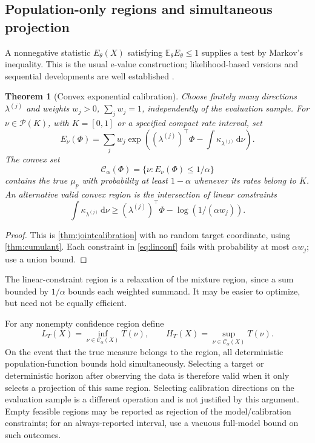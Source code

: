 \documentclass[11pt]{article}
\numberwithin{equation}{section}
\newtheorem{theorem}{Theorem}[section]
\theoremstyle{definition}
\theoremstyle{remark}
\newcommand{\E}{\mathbb E}
\newcommand{\Prob}{\mathcal P}
\newcommand{\Ccal}{\mathcal C}
\newcommand{\dd}{\,\mathrm d}
\begin{document}
\subsection{Population-only regions and simultaneous projection}
A nonnegative statistic $E_\theta(X)$ satisfying $\E_\theta E_\theta\le1$ supplies a test by Markov's inequality. This is the usual e-value construction; likelihood-based versions and sequential developments are well established \cite{Wasserman2020,Howard2021}.

\begin{theorem}[Convex exponential calibration]\label{thm:calibration}
Choose finitely many directions $\lambda^{(j)}$ and weights $w_j>0$, $\sum_jw_j=1$, independently of the evaluation sample. For $\nu\in\Prob(K)$, with $K=[0,1]$ or a specified compact rate interval, set
\[
 E_\nu(\Phi)=\sum_jw_j\exp\left((\lambda^{(j)})^\top\Phi
                               -\int\kappa_{\lambda^{(j)}}\dd\nu\right).
\]
The convex set
\begin{equation}\label{eq:confset}
 \Ccal_\alpha(\Phi)=\{\nu:E_\nu(\Phi)\le1/\alpha\}
\end{equation}
contains the true $\mu_p$ with probability at least $1-\alpha$ whenever its rates belong to $K$.
An alternative valid convex region is the intersection of linear constraints
\begin{equation}\label{eq:linconf}
 \int\kappa_{\lambda^{(j)}}\dd\nu\ge
 (\lambda^{(j)})^\top\Phi-\log(1/(\alpha w_j)).
\end{equation}
\end{theorem}
\begin{proof}
This is \cref{thm:jointcalibration} with no random target coordinate, using \cref{thm:cumulant}. Each constraint in \eqref{eq:linconf} fails with probability at most $\alpha w_j$; use a union bound.
\end{proof}
The linear-constraint region is a relaxation of the mixture region, since a sum bounded by $1/\alpha$ bounds each weighted summand. It may be easier to optimize, but need not be equally efficient.

For any nonempty confidence region define
\begin{equation}\label{eq:projection}
 L_T(X)=\inf_{\nu\in\Ccal_\alpha(X)}T(\nu),\qquad
 H_T(X)=\sup_{\nu\in\Ccal_\alpha(X)}T(\nu).
\end{equation}
On the event that the true measure belongs to the region, all deterministic population-function bounds hold simultaneously. Selecting a target or deterministic horizon after observing the data is therefore valid when it only selects a projection of this same region. Selecting calibration directions on the evaluation sample is a different operation and is not justified by this argument. Empty feasible regions may be reported as rejection of the model/calibration constraints; for an always-reported interval, use a vacuous full-model bound on such outcomes.
\end{document}
